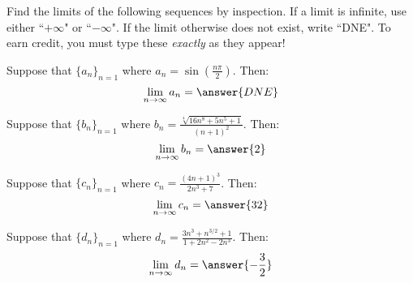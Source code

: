\documentclass{ximera}
\author{Jim Talamo}
\begin{document}
\begin{exercise}

Find the limits of the following sequences by inspection.  If a limit is infinite, use either ``$+\infty$" or ``$-\infty$".  If the limit otherwise does not exist, write ``DNE".  To earn credit, you must type these \emph{exactly} as they appear!

\begin{exercise}
Suppose that $\{a_n \}_{n=1}$ where $a_n = \sin\left(\frac{n \pi}{2}\right)$.  Then:
\[
\lim_{n \to \infty} a_n = \answer{DNE}
\]
\end{exercise}

\begin{exercise}
Suppose that $\{b_n \}_{n=1}$ where $b_n = \frac{\sqrt[4]{16n^8+5n^5+1}}{(n+1)^2}$.  Then:
\[
\lim_{n \to \infty} b_n = \answer{2}
\]
\end{exercise}

\begin{exercise}
Suppose that $\{c_n \}_{n=1}$ where $c_n = \frac{(4n+1)^3}{2n^3+7}$.  Then:
\[
\lim_{n \to \infty} c_n = \answer{32}
\]
\end{exercise}

\begin{exercise}
Suppose that $\{d_n \}_{n=1}$ where $d_n = \frac{3n^3+n^{3/2}+1}{1+2n^2-2n^3}$.  Then:
\[
\lim_{n \to \infty} d_n =  \answer{-\frac{3}{2}}
\]
\end{exercise}


\end{exercise}
\end{document}
